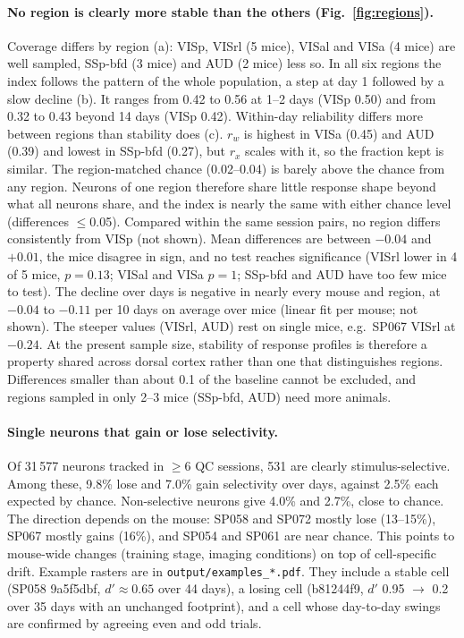 \documentclass[10pt,a4paper]{article}
\begin{document}
\paragraph{No region is clearly more stable than the others (Fig.~\ref{fig:regions}).}
Coverage differs by region (a): VISp, VISrl (5 mice), VISal and VISa (4 mice) are well sampled, SSp-bfd (3 mice) and AUD (2 mice) less so.
In all six regions the index follows the pattern of the whole population, a step at day 1 followed by a slow decline (b). It ranges from 0.42 to 0.56 at 1--2 days (VISp 0.50) and from 0.32 to 0.43 beyond 14 days (VISp 0.42).
Within-day reliability differs more between regions than stability does (c). $r_w$ is highest in VISa (0.45) and AUD (0.39) and lowest in SSp-bfd (0.27), but $r_x$ scales with it, so the fraction kept is similar.
The region-matched chance (0.02--0.04) is barely above the chance from any region. Neurons of one region therefore share little response shape beyond what all neurons share, and the index is nearly the same with either chance level (differences $\leq$0.05).
Compared within the same session pairs, no region differs consistently from VISp (not shown). Mean differences are between $-0.04$ and $+0.01$, the mice disagree in sign, and no test reaches significance (VISrl lower in 4 of 5 mice, $p=0.13$; VISal and VISa $p=1$; SSp-bfd and AUD have too few mice to test).
The decline over days is negative in nearly every mouse and region, at $-0.04$ to $-0.11$ per 10 days on average over mice (linear fit per mouse; not shown). The steeper values (VISrl, AUD) rest on single mice, e.g.\ SP067 VISrl at $-0.24$.
At the present sample size, stability of response profiles is therefore a property shared across dorsal cortex rather than one that distinguishes regions. Differences smaller than about 0.1 of the baseline cannot be excluded, and regions sampled in only 2--3 mice (SSp-bfd, AUD) need more animals.

\paragraph{Single neurons that gain or lose selectivity.}
Of 31\,577 neurons tracked in $\geq$6 QC sessions, 531 are clearly stimulus-selective.
Among these, 9.8\% lose and 7.0\% gain selectivity over days, against 2.5\% each expected by chance.
Non-selective neurons give 4.0\% and 2.7\%, close to chance.
The direction depends on the mouse: SP058 and SP072 mostly lose (13--15\%), SP067 mostly gains (16\%), and SP054 and SP061 are near chance.
This points to mouse-wide changes (training stage, imaging conditions) on top of cell-specific drift.
Example rasters are in \texttt{output/examples\_*.pdf}. They include a stable cell (SP058 9a5f5dbf, $d'\approx0.65$ over 44 days), a losing cell (b81244f9, $d'$ 0.95 $\to$ 0.2 over 35 days with an unchanged footprint), and a cell whose day-to-day swings are confirmed by agreeing even and odd trials.
\end{document}
